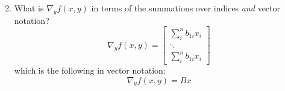 \documentclass{article}
\begin{document}
\begin{aprob}
\begin{enumerate}
\begin{equation*}
        \end{equation*}
    	\newpage
        \item {} What is $\nabla_y f(x,y)$ in terms of the summations over indices \emph{and} vector notation?
        \begin{equation*}
            \nabla_y f(x,y) = \begin{bmatrix} \sum^n_i b_{1i} x_i \\ \ddots \\ \sum^n_i b_{1i} x_i \end{bmatrix}
        \end{equation*}
        which is the following in vector notation:
        \begin{equation*}
            \boxed{\nabla_y f(x,y) = Bx}
        \end{equation*}
    \end{enumerate}
\end{aprob}
\end{document}
